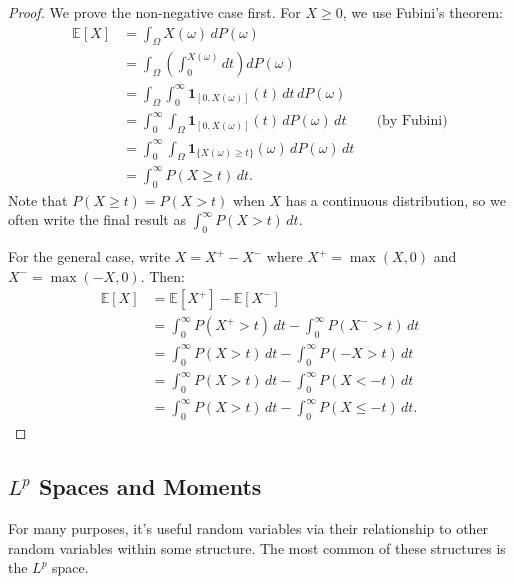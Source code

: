\documentclass[11pt,reqno]{amsart}
\theoremstyle{definition}
\theoremstyle{remark}
\begin{document}
\begin{proof}
	We prove the non-negative case first. For $X \geq 0$, we use Fubini's theorem:
	\begin{align*}
		\mathbb{E}[X] & = \int_\Omega X(\omega) \, dP(\omega)                                                                             \\
		              & = \int_\Omega \left( \int_0^{X(\omega)} dt \right) dP(\omega)                                                     \\
		              & = \int_\Omega \int_0^\infty \mathbf{1}_{[0, X(\omega)]}(t) \, dt \, dP(\omega)                                    \\
		              & = \int_0^\infty \int_\Omega \mathbf{1}_{[0, X(\omega)]}(t) \, dP(\omega) \, dt            &  & \text{(by Fubini)} \\
		              & = \int_0^\infty \int_\Omega \mathbf{1}_{\{X(\omega) \geq t\}}(\omega) \, dP(\omega) \, dt                         \\
		              & = \int_0^\infty P(X \geq t) \, dt.
	\end{align*}
	Note that $P(X \geq t) = P(X > t)$ when $X$ has a continuous distribution, so we often write the final result as $\int_0^\infty P(X > t) \, dt$.

	For the general case, write $X = X^+ - X^-$ where $X^+ = \max(X, 0)$ and $X^- = \max(-X, 0)$. Then:
	\begin{align*}
		\mathbb{E}[X] & = \mathbb{E}[X^+] - \mathbb{E}[X^-]                                \\
		              & = \int_0^\infty P(X^+ > t) \, dt - \int_0^\infty P(X^- > t) \, dt  \\
		              & = \int_0^\infty P(X > t) \, dt - \int_0^\infty P(-X > t) \, dt     \\
		              & = \int_0^\infty P(X > t) \, dt - \int_0^\infty P(X < -t) \, dt     \\
		              & = \int_0^\infty P(X > t) \, dt - \int_0^\infty P(X \leq -t) \, dt.
	\end{align*}
\end{proof}

\subsection{\(L^p\) Spaces and Moments}

For many purposes, it's useful random variables via their relationship to other random variables within some structure. The most common of these structures is the \(L^p\) space.
\end{document}

